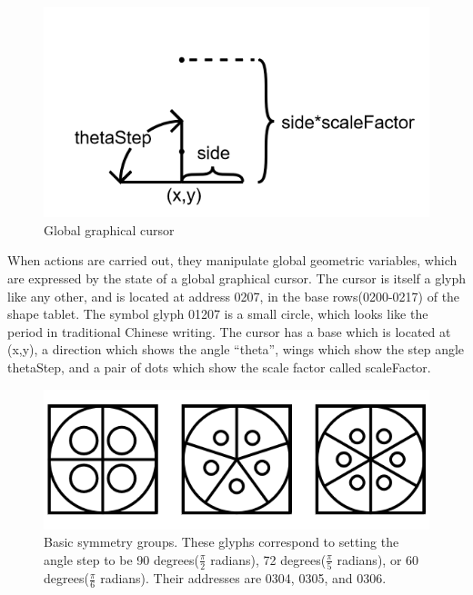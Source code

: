 \documentclass[11pt]{article}
\begin{document}
\begin{figure}
\includegraphics[width=\linewidth]{figures/figure7_globalCursor.png}
\caption{Global graphical cursor}
\end{figure}




    When actions are carried out, they manipulate global geometric variables, which are expressed by the state of a global graphical cursor.  The cursor is itself a glyph like any other, and is located at address 0207, in the base rows(0200-0217) of the shape tablet.  The symbol glyph 01207 is a small circle, which looks like the period in traditional Chinese writing.  The cursor has a base which is located at (x,y), a direction which shows the angle ``theta'', wings which show the step angle thetaStep, and a pair of dots which show the scale factor called scaleFactor.  




\begin{figure}
\includegraphics[width=\linewidth]{figures/figure8_symmetries.png}
\caption{Basic symmetry groups.  These glyphs correspond to setting the angle step to be 90 degrees($\frac{\pi}{2}$ radians), 72 degrees($\frac{\pi}{5}$ radians), or 60 degrees($\frac{\pi}{6}$ radians). Their addresses are 0304, 0305, and 0306. }
\end{figure}
\end{document}
